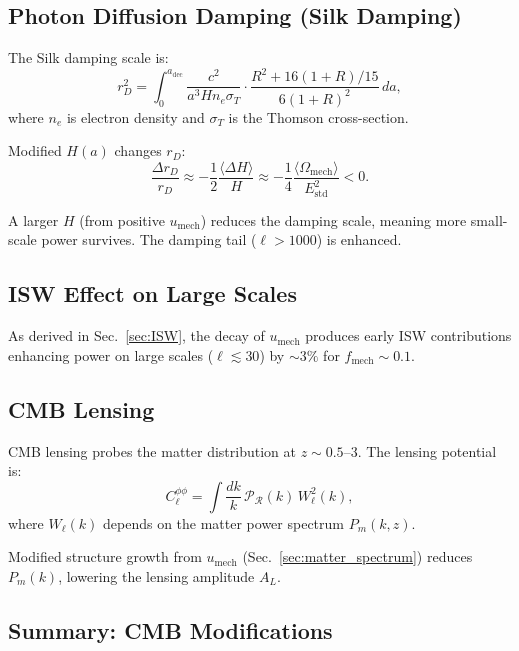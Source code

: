 \documentclass[11pt,a4paper]{article}
\newcommand{\umech}{\ensuremath{u_{\mathrm{mech}}}}
\newcommand{\fmech}{\ensuremath{f_{\mathrm{mech}}}}
\newcommand{\adec}{\ensuremath{a_{\mathrm{dec}}}}
\theoremstyle{definition}
\theoremstyle{remark}
\begin{document}
\subsection{Photon Diffusion Damping (Silk Damping)}
\label{sec:silk_damping}

The Silk damping scale is:
\begin{equation}
r_D^2 = \int_0^{\adec} \frac{c^2}{a^3 H n_e \sigma_T} \cdot \frac{R^2 + 16(1+R)/15}{6(1+R)^2} \, da,
\end{equation}
where $n_e$ is electron density and $\sigma_T$ is the Thomson cross-section.

Modified $H(a)$ changes $r_D$:
\begin{equation}
\frac{\Delta r_D}{r_D} \approx -\frac{1}{2}\frac{\langle\Delta H\rangle}{H} \approx -\frac{1}{4}\frac{\langle\Omega_{\mathrm{mech}}\rangle}{E_{\mathrm{std}}^2} < 0.
\end{equation}

A larger $H$ (from positive $\umech$) reduces the damping scale, meaning more small-scale power survives. The damping tail ($\ell > 1000$) is enhanced.

\subsection{ISW Effect on Large Scales}
\label{sec:ISW_large_scales}

As derived in Sec.~\ref{sec:ISW}, the decay of $\umech$ produces early ISW contributions enhancing power on large scales ($\ell \lesssim 30$) by $\sim 3\%$ for $\fmech \sim 0.1$.

\subsection{CMB Lensing}
\label{sec:cmb_lensing}

CMB lensing probes the matter distribution at $z \sim 0.5$--$3$. The lensing potential is:
\begin{equation}
C_\ell^{\phi\phi} = \int \frac{dk}{k} \, \mathcal{P}_\mathcal{R}(k) \, W_\ell^2(k),
\end{equation}
where $W_\ell(k)$ depends on the matter power spectrum $P_m(k,z)$.

Modified structure growth from $\umech$ (Sec.~\ref{sec:matter_spectrum}) reduces $P_m(k)$, lowering the lensing amplitude $A_L$.

\subsection{Summary: CMB Modifications}
\label{sec:cmb_summary_table}
\end{document}
